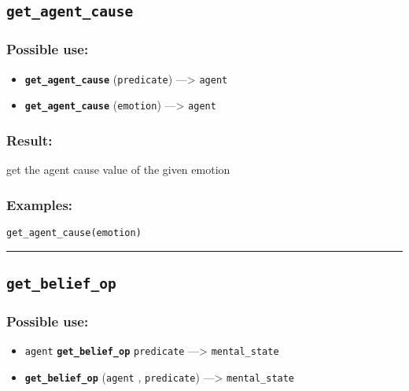 \documentclass[]{book}
\providecommand{\tightlist}{%
  \setlength{\itemsep}{0pt}\setlength{\parskip}{0pt}}
\theoremstyle{definition}
\theoremstyle{definition}
\theoremstyle{definition}
\theoremstyle{remark}
\begin{document}
\subsection{\texorpdfstring{\texttt{get\_agent\_cause}}{get\_agent\_cause}}\label{get_agent_cause}

\subsubsection{Possible use:}\label{possible-use-196}

\begin{itemize}
\tightlist
\item
  \textbf{\texttt{get\_agent\_cause}} (\texttt{predicate})
  ---\textgreater{} \texttt{agent}
\item
  \textbf{\texttt{get\_agent\_cause}} (\texttt{emotion})
  ---\textgreater{} \texttt{agent}
\end{itemize}

\subsubsection{Result:}\label{result-190}

get the agent cause value of the given emotion

\subsubsection{Examples:}\label{examples-143}

\begin{verbatim}
get_agent_cause(emotion) 
\end{verbatim}

\begin{center}\rule{0.5\linewidth}{\linethickness}\end{center}

\subsection{\texorpdfstring{\texttt{get\_belief\_op}}{get\_belief\_op}}\label{get_belief_op}

\subsubsection{Possible use:}\label{possible-use-197}

\begin{itemize}
\tightlist
\item
  \texttt{agent} \textbf{\texttt{get\_belief\_op}} \texttt{predicate}
  ---\textgreater{} \texttt{mental\_state}
\item
  \textbf{\texttt{get\_belief\_op}} (\texttt{agent} ,
  \texttt{predicate}) ---\textgreater{} \texttt{mental\_state}
\end{itemize}
\end{document}
